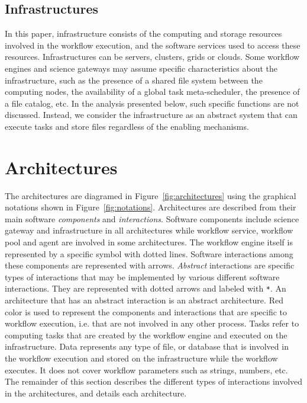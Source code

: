 \documentclass[preprint,3p,twocolumn]{elsarticle}
\begin{document}
\subsection{Infrastructures}

In this paper, infrastructure consists of the computing and storage
resources involved in the workflow execution, and the software
services used to access these resources. Infrastructures can be
servers, clusters, grids or clouds. Some workflow engines and science
gateways may assume specific characteristics about the infrastructure,
such as the presence of a shared file system between the computing
nodes, the availability of a global task meta-scheduler, the presence
of a file catalog, etc. In the analysis presented below, such specific
functions are not discussed. Instead, we consider the infrastructure
as an abstract system that can execute tasks and store files
regardless of the enabling mechanisms. 

\section{Architectures}
\label{sec:architectures}

The architectures are diagramed in Figure~\ref{fig:architectures}
using the graphical notations shown in
Figure~\ref{fig:notations}. Architectures are described from their
main software \emph{components} and \emph{interactions}. Software
components include science gateway and infrastructure in all
architectures while workflow service, workflow pool and agent are
involved in some architectures. The workflow engine itself is
represented by a specific symbol with dotted lines. Software
interactions among these components are represented with
arrows. \emph{Abstract} interactions are specific types of
interactions that may be implemented by various different software
interactions. They are represented with dotted arrows and labeled with
 \texttt{*}. An architecture that has an abstract interaction is an
abstract architecture. Red color is used to represent the components
and interactions that are specific to workflow execution, i.e. that
are not involved in any other process. Tasks refer to computing tasks
that are created by the workflow engine and executed on the
infrastructure. Data represents any type of file, or database that is
involved in the workflow execution and stored on the infrastructure
while the workflow executes. It does not cover workflow parameters
such as strings, numbers, etc. The remainder of this section describes
the different types of interactions involved in the architectures, and
details each architecture.
\end{document}
